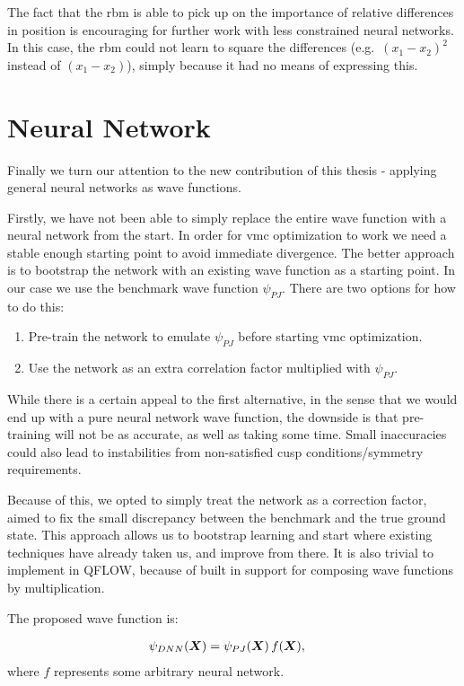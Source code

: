 \documentclass[Thesis.tex]{subfiles}
\begin{document}
The fact that the \gls{rbm} is able to pick up on the importance of relative
differences in position is encouraging for further work with less constrained
neural networks. In this case, the \gls{rbm} could not learn to square the differences
(e.g.\ $(x_1 - x_2)^2$ instead of $(x_1-x_2)$), simply because it had no means
of expressing this.

\section{Neural Network}

Finally we turn our attention to the new contribution of this thesis - applying
general neural networks as wave functions.

Firstly, we have not been able to simply replace the entire wave function with a
neural network from the start. In order for \gls{vmc} optimization to work we need a
stable enough starting point to avoid immediate divergence. The better approach
is to bootstrap the network with an existing wave function as a starting point.
In our case we use the benchmark wave function $\psi_{PJ}$. There are two
options for how to do this:

\begin{enumerate}
\item Pre-train the network to emulate $\psi_{PJ}$ before starting \gls{vmc}
  optimization.
\item Use the network as an extra correlation factor multiplied with $\psi_{PJ}$.
\end{enumerate}
While there is a certain appeal to the first alternative, in the
sense that we would end up with a pure neural network wave function, the
downside is that pre-training will not be as accurate, as well as taking
some time. Small inaccuracies could also lead to instabilities from non-satisfied
cusp conditions/symmetry requirements.

Because of this, we opted to simply treat the network as a correction factor,
aimed to fix the small discrepancy between the benchmark and the true ground
state. This approach allows us to bootstrap learning and start where existing
techniques have already taken us, and improve from there. It is also trivial to
implement in QFLOW, because of built in support for composing wave functions by
multiplication.

The proposed wave function is:

\begin{align}\label{eq:pade-dnn}
  \psi_{DNN}(\bm{X}) &= \psi_{PJ}(\bm{X})\, f(\bm{X}),
\end{align}
where $f$ represents some arbitrary neural network.
\end{document}
